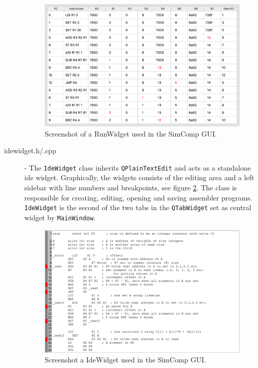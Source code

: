 \begin{description}
\begin{figure}[H]
\centering
\includegraphics[scale=0.3]{img/RunWidget.png}
\caption{Screenshot of a RunWidget used in the SimComp GUI.}
\label{fig:runwidget}
\end{figure}


\item [idewidget.h/.cpp] - The \texttt{IdeWidget} class inherits \texttt{QPlainTextEdit} and acts as a standalone ide widget. Graphically, the widgets consists of the editing area and a left sidebar with line numbers and breakpoints, see figure \ref{fig:idewidget}. The class is responsible for creating, editing, opening and saving assembler programs. \texttt{IdeWidget} is the second of the two tabs in the \texttt{QTabWidget} set as central widget by \texttt{MainWindow}.

\begin{figure}[H]
\centering
\includegraphics[scale=0.3]{img/IdeWidget.png}
\caption{Screenshot a IdeWidget used in the SimComp GUI.}
\label{fig:idewidget}
\end{figure}


\end{description}
